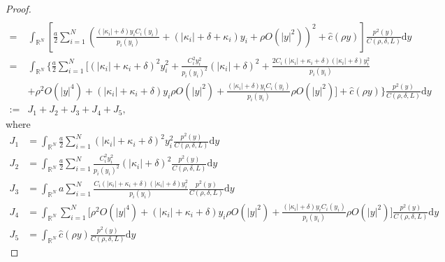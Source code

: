 \documentclass[12pt,reqno]{amsart}
\numberwithin{equation}{section}
\begin{document}
\begin{proof}
\begin{align*}
   \\= \!&
 \int_{\mathbb{R}^N} 
 \left[\frac{a}{2}\sum_{i=1}^N\left(\frac{(|\kappa_i|+\delta)y_i C_i(y_i)}
 { p_i(y_i)}+(|\kappa_i|+\delta+\kappa_i)y_i+ \rho O(|y|^2)\right)^2
 \!\!+\hat{c}(\rho y) \right] 
  \frac{p^2(y)}{C(\rho,\delta,L)} \mathrm{d}y
 \\ =\! &
 \int_{\mathbb{R}^N}\Bigg\{
\frac{a}{2}\sum_{i=1}^N
\Bigg[
\left( |\kappa_i| + \kappa_i + \delta \right)^2 y_i^2
+
\frac{C_i^2 y_i^2}{p_i(y_i)^2} (|\kappa_i| + \delta)^2
+
\frac{2 C_i (|\kappa_i| + \kappa_i + \delta)(|\kappa_i|+\delta)y_i^2}{p_i(y_i)}
\\
&+\! \rho^2 O(|y|^4)+(|\kappa_i|\! +\! \kappa_i\! +\! \delta)y_i\rho  O(|y|^2)\!
\!+\!\!\frac{(|\kappa_i|\!+\!\delta)y_iC_i(y_i)}
 { p_i(y_i)} \rho  O(|y|^2)\!\Bigg]\!\!
+\! \hat{c}(\rho y)\!
\Bigg\}\!\frac{p^2(y)}{C(\rho,\delta,L)}\mathrm{d}y
\\:= &J_1+J_2+J_3+J_4+J_5,
\end{align*}
where
\begin{align*}
J_1\!&=\!\int_{\mathbb{R}^N}
\frac{a}{2}\sum_{i=1}^N
\left( |\kappa_i| + \kappa_i + \delta \right)^2 y_i^2
\frac{p^2(y)}{C(\rho,\delta,L)}\mathrm{d}y\\
J_2\!&=\!\int_{\mathbb{R}^N}
\frac{a}{2}\sum_{i=1}^N
\frac{C_i^2 y_i^2}{p_i(y_i)^2} (|\kappa_i| + \delta)^2
\frac{p^2(y)}{C(\rho,\delta,L)}\mathrm{d}y\\
J_3\!&=\!\int_{\mathbb{R}^N}
a\sum_{i=1}^N
\frac{ C_i (|\kappa_i| + \kappa_i + \delta)(|\kappa_i|+\delta)y_i^2}{p_i(y_i)}
\frac{p^2(y)}{C(\rho,\delta,L)}\mathrm{d}y\\
J_4\!&=\!\int_{\mathbb{R}^N}\!
\sum_{i=1}^N\! \Bigg[\!
\rho^2 O(|y|^4)\!+\!(|\kappa_i|\! +\! \kappa_i\! +\! \delta)y_i\rho  O(|y|^2)
\!+\!\frac{(|\kappa_i|+\delta)y_iC_i(y_i)}
 { p_i(y_i)} \rho  O(|y|^2)\!\Bigg]\!
\frac{p^2(y)}{C(\rho,\delta,L)}\mathrm{d}y\\
J_5\!&=\!\int_{\mathbb{R}^N} \hat{c}(\rho y)
\frac{p^2(y)}{C(\rho,\delta,L)}\mathrm{d}y
\end{align*}


\end{proof}
\end{document}
